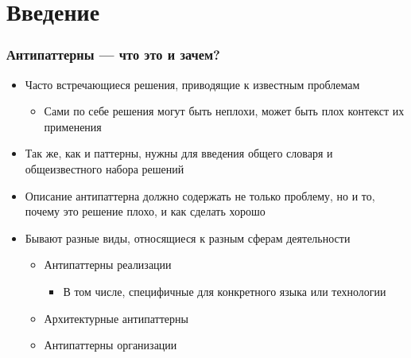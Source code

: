 \documentclass{../cscslides}
\begin{document}
    
    \frame{\titlepage}

    \section{Введение}

    \begin{frame}
        \frametitle{Антипаттерны --- что это и зачем?}
        \begin{itemize}
            \item Часто встречающиеся решения, приводящие к известным проблемам
            \begin{itemize}
                \item Сами по себе решения могут быть неплохи, может быть плох контекст их применения
            \end{itemize}
            \item Так же, как и паттерны, нужны для введения общего словаря и общеизвестного набора решений
            \item Описание антипаттерна должно содержать не только проблему, но и то, почему это решение плохо, и как сделать хорошо
            \item Бывают разные виды, относящиеся к разным сферам деятельности
            \begin{itemize}
                \item Антипаттерны реализации
                \begin{itemize}
                    \item В том числе, специфичные для конкретного языка или технологии
                \end{itemize}
                \item Архитектурные антипаттерны
                \item Антипаттерны организации
            \end{itemize}
        \end{itemize}
    \end{frame}
\end{document}
